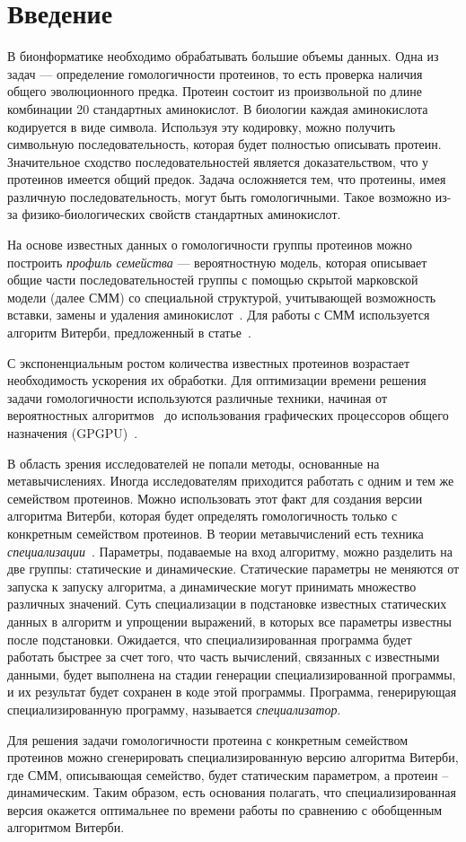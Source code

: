 \section*{Введение}

В бионформатике необходимо обрабатывать большие объемы данных.
Одна из задач --- определение гомологичности протеинов, то есть проверка наличия общего эволюционного предка.
Протеин состоит из произвольной по длине комбинации 20 стандартных аминокислот.
В биологии каждая аминокислота кодируется в виде символа.
Используя эту кодировку, можно получить символьную последовательность,
которая будет полностью описывать протеин.
Значительное сходство последовательностей является доказательством, что у
протеинов имеется общий предок.
Задача осложняется тем, что протеины, имея различную последовательность, могут
быть гомологичными.
Такое возможно из-за физико-биологических свойств стандартных аминокислот.

На основе известных данных о гомологичности группы протеинов можно построить
\emph{профиль семейства} --- вероятностную модель, которая описывает общие
части последовательностей группы с помощью  скрытой марковской модели (далее СММ) со специальной структурой, учитывающей возможность вставки, замены и
удаления аминокислот~\cite{HMM_Eddy}.
Для работы с СММ используется алгоритм Витерби, предложенный в статье~\cite{Viterbi}.

С экспоненциальным ростом количества известных протеинов возрастает
необходимость ускорения их обработки.
Для оптимизации времени решения задачи гомологичности используются различные 
техники, начиная от вероятностных алгоритмов~\cite{MSV_Eddy} до использования
графических процессоров общего назначения (GPGPU)~\cite{cudampf}.

В область зрения исследователей не попали методы, основанные на
метавычислениях.
Иногда исследователям приходится работать с одним и тем же семейством
протеинов.
Можно использовать этот факт для создания версии алгоритма Витерби, 
которая будет определять гомологичность только с конкретным семейством протеинов.
В теории метавычислений есть техника \emph{специализации}~\cite{Jones_spec}.
Параметры, подаваемые на вход алгоритму, можно разделить на две группы:
статические и динамические.
Статические параметры не меняются от запуска к запуску алгоритма, а 
динамические могут принимать множество различных значений.
Суть специализации в подстановке известных статических данных в алгоритм и
упрощении выражений, в которых все параметры известны после подстановки.
Ожидается, что специализированная программа будет работать быстрее за счет
того, что часть вычислений, связанных с известными данными, будет выполнена на
стадии генерации специализированной программы, и их результат будет сохранен в
коде этой программы.
Программа, генерирующая специализированную программу, называется \emph{специализатор}.

Для решения задачи гомологичности протеина с конкретным семейством протеинов 
можно сгенерировать специализированную версию алгоритма Витерби,
где СММ, описывающая семейство, будет статическим параметром, 
а протеин -- динамическим.
Таким образом, есть основания полагать, что специализированная версия окажется 
оптимальнее по времени работы по сравнению с обобщенным алгоритмом Витерби.
